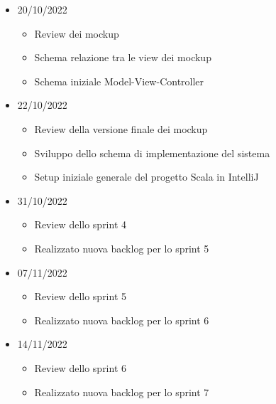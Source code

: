 \begin{itemize}
\begin{itemize}
        \end{itemize}
    \item 20/10/2022
        \begin{itemize}
            \item Review dei mockup
            \item Schema relazione tra le view dei mockup
            \item Schema iniziale Model-View-Controller
        \end{itemize}
    \item 22/10/2022
        \begin{itemize}
            \item Review della versione finale dei mockup
            \item Sviluppo dello schema di implementazione del sistema
            \item Setup iniziale generale del progetto Scala in IntelliJ
        \end{itemize}
    \item 31/10/2022
        \begin{itemize}
            \item Review dello sprint 4
            \item Realizzato nuova backlog per lo sprint 5
        \end{itemize}
    \item 07/11/2022
        \begin{itemize}
            \item Review dello sprint 5
            \item Realizzato nuova backlog per lo sprint 6
        \end{itemize}
    \item 14/11/2022
        \begin{itemize}
            \item Review dello sprint 6
            \item Realizzato nuova backlog per lo sprint 7
        \end{itemize}
\end{itemize}

